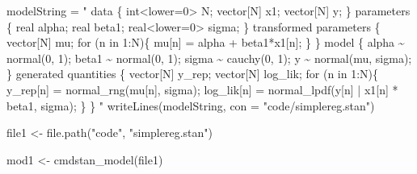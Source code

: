 \documentclass[
  10pt,
  italian,
  a4paper,
  extrafontsizes,onecolumn,openright
  ]{memoir}
\newenvironment{Shaded}{\begin{snugshade}}{\end{snugshade}}
\newcommand{\AttributeTok}[1]{\textcolor[rgb]{0.77,0.63,0.00}{#1}}
\newcommand{\FunctionTok}[1]{\textcolor[rgb]{0.00,0.00,0.00}{#1}}
\newcommand{\NormalTok}[1]{#1}
\newcommand{\OtherTok}[1]{\textcolor[rgb]{0.56,0.35,0.01}{#1}}
\newcommand{\SpecialCharTok}[1]{\textcolor[rgb]{0.00,0.00,0.00}{#1}}
\newcommand{\StringTok}[1]{\textcolor[rgb]{0.31,0.60,0.02}{#1}}
\theoremstyle{definition}
\theoremstyle{definition}
\theoremstyle{definition}
\theoremstyle{definition}
\theoremstyle{remark}
\begin{document}
\begin{Shaded}
\begin{Highlighting}[]
\NormalTok{modelString }\OtherTok{=} \StringTok{"}
\StringTok{data \{}
\StringTok{  int\textless{}lower=0\textgreater{} N;}
\StringTok{  vector[N] x1;}
\StringTok{  vector[N] y;}
\StringTok{\}}
\StringTok{parameters \{}
\StringTok{  real alpha;}
\StringTok{  real beta1;}
\StringTok{  real\textless{}lower=0\textgreater{} sigma;}
\StringTok{\}}
\StringTok{transformed parameters \{}
\StringTok{  vector[N] mu;}
\StringTok{  for (n in 1:N)\{}
\StringTok{    mu[n] = alpha + beta1*x1[n];}
\StringTok{  \}}
\StringTok{\}}
\StringTok{model \{}
\StringTok{  alpha \textasciitilde{} normal(0, 1);}
\StringTok{  beta1 \textasciitilde{} normal(0, 1);}
\StringTok{  sigma \textasciitilde{} cauchy(0, 1);}
\StringTok{  y \textasciitilde{} normal(mu, sigma);}
\StringTok{\}}
\StringTok{generated quantities \{}
\StringTok{  vector[N] y\_rep;}
\StringTok{  vector[N] log\_lik;}
\StringTok{  for (n in 1:N)\{}
\StringTok{    y\_rep[n] = normal\_rng(mu[n], sigma);}
\StringTok{    log\_lik[n] = normal\_lpdf(y[n] | x1[n] * beta1, sigma);}
\StringTok{  \}}
\StringTok{\}}
\StringTok{"}
\FunctionTok{writeLines}\NormalTok{(modelString, }\AttributeTok{con =} \StringTok{"code/simplereg.stan"}\NormalTok{)}
\end{Highlighting}
\end{Shaded}

\begin{Shaded}
\end{Shaded}

\begin{Shaded}
\begin{Highlighting}[]
\NormalTok{file1 }\OtherTok{\textless{}{-}} \FunctionTok{file.path}\NormalTok{(}\StringTok{"code"}\NormalTok{, }\StringTok{"simplereg.stan"}\NormalTok{)}
\end{Highlighting}
\end{Shaded}

\begin{Shaded}
\begin{Highlighting}[]
\NormalTok{mod1 }\OtherTok{\textless{}{-}} \FunctionTok{cmdstan\_model}\NormalTok{(file1)}
\end{Highlighting}
\end{Shaded}
\end{document}
